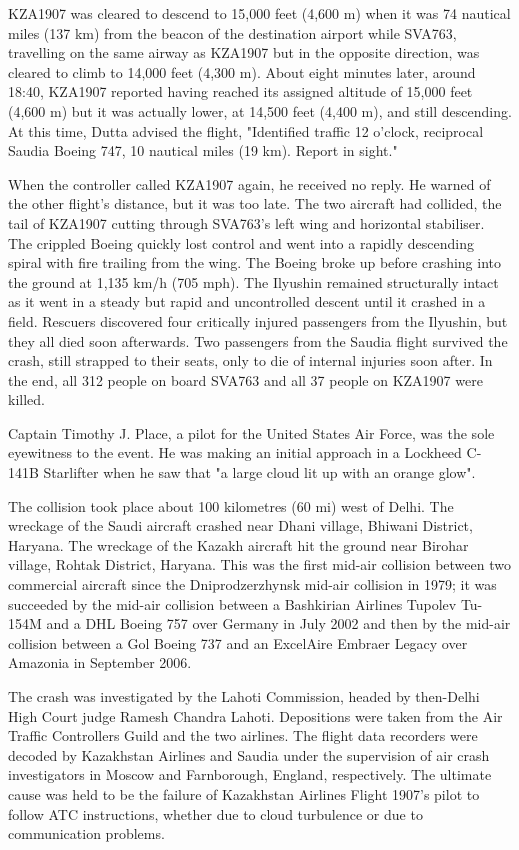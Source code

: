 \documentclass[a4paper,10pt]{article}
\begin{document}
KZA1907 was cleared to descend to 15,000 feet (4,600 m) when it was 74 nautical miles (137 km) from the beacon of the destination airport while SVA763, travelling on the same airway as KZA1907 but in the opposite direction, was cleared to climb to 14,000 feet (4,300 m). About eight minutes later, around 18:40, KZA1907 reported having reached its assigned altitude of 15,000 feet (4,600 m) but it was actually lower, at 14,500 feet (4,400 m), and still descending. At this time, Dutta advised the flight, "Identified traffic 12 o'clock, reciprocal Saudia Boeing 747, 10 nautical miles (19 km). Report in sight."\par

When the controller called KZA1907 again, he received no reply. He warned of the other flight's distance, but it was too late. The two aircraft had collided, the tail of KZA1907 cutting through SVA763's left wing and horizontal stabiliser. The crippled Boeing quickly lost control and went into a rapidly descending spiral with fire trailing from the wing. The Boeing broke up before crashing into the ground at 1,135 km/h (705 mph). The Ilyushin remained structurally intact as it went in a steady but rapid and uncontrolled descent until it crashed in a field. Rescuers discovered four critically injured passengers from the Ilyushin, but they all died soon afterwards. Two passengers from the Saudia flight survived the crash, still strapped to their seats, only to die of internal injuries soon after. In the end, all 312 people on board SVA763 and all 37 people on KZA1907 were killed.\par

Captain Timothy J. Place, a pilot for the United States Air Force, was the sole eyewitness to the event. He was making an initial approach in a Lockheed C-141B Starlifter when he saw that "a large cloud lit up with an orange glow".\par

The collision took place about 100 kilometres (60 mi) west of Delhi. The wreckage of the Saudi aircraft crashed near Dhani village, Bhiwani District, Haryana. The wreckage of the Kazakh aircraft hit the ground near Birohar village, Rohtak District, Haryana. This was the first mid-air collision between two commercial aircraft since the Dniprodzerzhynsk mid-air collision in 1979; it was succeeded by the mid-air collision between a Bashkirian Airlines Tupolev Tu-154M and a DHL Boeing 757 over Germany in July 2002 and then by the mid-air collision between a Gol Boeing 737 and an ExcelAire Embraer Legacy over Amazonia in September 2006.\par 
The crash was investigated by the Lahoti Commission, headed by then-Delhi High Court judge Ramesh Chandra Lahoti. Depositions were taken from the Air Traffic Controllers Guild and the two airlines. The flight data recorders were decoded by Kazakhstan Airlines and Saudia under the supervision of air crash investigators in Moscow and Farnborough, England, respectively. The ultimate cause was held to be the failure of Kazakhstan Airlines Flight 1907's pilot to follow ATC instructions, whether due to cloud turbulence or due to communication problems.\par
\end{document}
